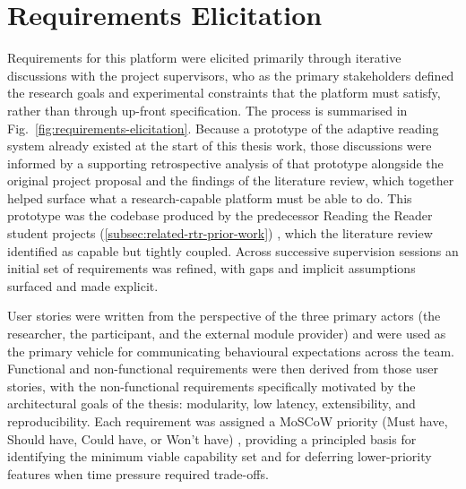 \section{Requirements Elicitation}
\label{sec:requirements-elicitation}

Requirements for this platform were elicited primarily through iterative discussions with the project supervisors, who as the primary stakeholders defined the research goals and experimental constraints that the platform must satisfy, rather than through up-front specification.
The process is summarised in Fig.~\ref{fig:requirements-elicitation}.
Because a prototype of the adaptive reading system already existed at the start of this thesis work, those discussions were informed by a supporting retrospective analysis of that prototype alongside the original project proposal \cite{dtucompute2025rtr} and the findings of the literature review, which together helped surface what a research-capable platform must be able to do.
This prototype was the codebase produced by the predecessor Reading the Reader student projects (\cref{subsec:related-rtr-prior-work}) \cite{refsgaard2024rtr, pereira2024typography}, which the literature review identified as capable but tightly coupled.
Across successive supervision sessions an initial set of requirements was refined, with gaps and implicit assumptions surfaced and made explicit.

User stories were written from the perspective of the three primary actors (the researcher, the participant, and the external module provider) and were used as the primary vehicle for communicating behavioural expectations across the team.
Functional and non-functional requirements were then derived from those user stories, with the non-functional requirements specifically motivated by the architectural goals of the thesis: modularity, low latency, extensibility, and reproducibility.
Each requirement was assigned a MoSCoW priority (Must have, Should have, Could have, or Won't have) \cite{clegg1994moscow}, providing a principled basis for identifying the minimum viable capability set and for deferring lower-priority features when time pressure required trade-offs.


